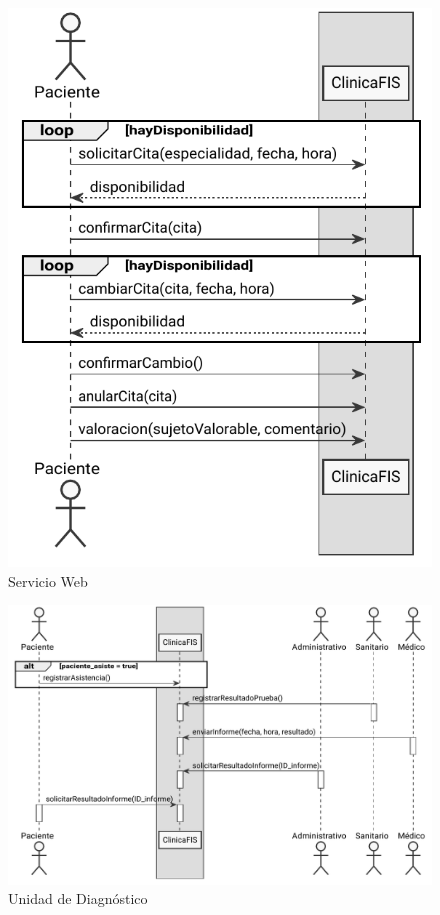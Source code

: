 \documentclass[11pt,a4paper]{article}
\begin{document}
\begin{figure}[H]
	\caption{Servicio Web}
	\centering
	\includegraphics{diagramas/pdf/diagramaServicioWeb.pdf}
\end{figure}

\begin{figure}[H]
	\caption{Unidad de Diagnóstico}
	\centering
	\includegraphics{diagramas/pdf/diagramaUnidadDiagnostico.pdf}
\end{figure}
\end{document}
